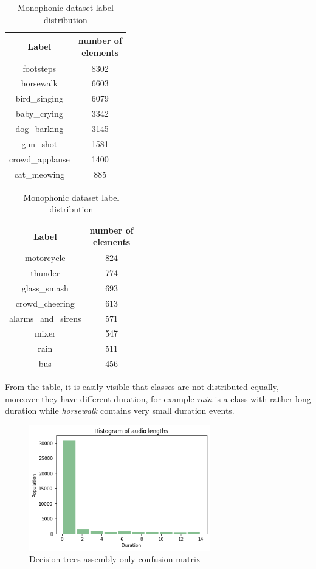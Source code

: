 \documentclass{article}
\begin{document}
\begin{table}[H]
	\begin{center}
		\begin{tabular}{ |c | c | }
			\hline
			Label 				& \makecell{number of\\ elements} \\ 
			\hline
			footsteps 			& 8302 \\
			\hline
			horsewalk			& 6603 \\
			\hline
			bird\_singing 		& 6079 \\
			\hline
			baby\_crying 		& 3342 \\
			\hline
			dog\_barking 		& 3145 \\
			\hline
			gun\_shot 			& 1581 \\
			\hline
			crowd\_applause 	& 1400 \\
			\hline
			cat\_meowing 		& 885 \\
			\hline
		\end{tabular}
		\begin{tabular}{ |c | c | }
			\hline
			Label 				& \makecell{number of\\ elements} \\ 
			\hline
			motorcycle 			& 824 \\
			\hline
			thunder 			& 774 \\
			\hline
			glass\_smash 		& 693 \\
			\hline
			crowd\_cheering 	& 613 \\
			\hline
			alarms\_and\_sirens & 571 \\
			\hline
			mixer 				& 547 \\
			\hline
			rain 				& 511 \\
			\hline
			bus 				& 456 \\
			\hline
		\end{tabular}
		\caption{Monophonic dataset label distribution}
		\label{tab:poly_distribution}
	\end{center}
\end{table}

From the table, it is easily visible that classes are not distributed equally, moreover they have different duration, for example \textit{rain} is a class with rather long duration while \textit{horsewalk} contains very small duration events. 

\begin{figure}[H]
	\centering
	\includegraphics[width=0.7\textwidth]{./images/poly/duration.png}	
	\caption{Decision trees assembly only confusion matrix}
	\label{fig:poly_duration}
\end{figure}
\end{document}
